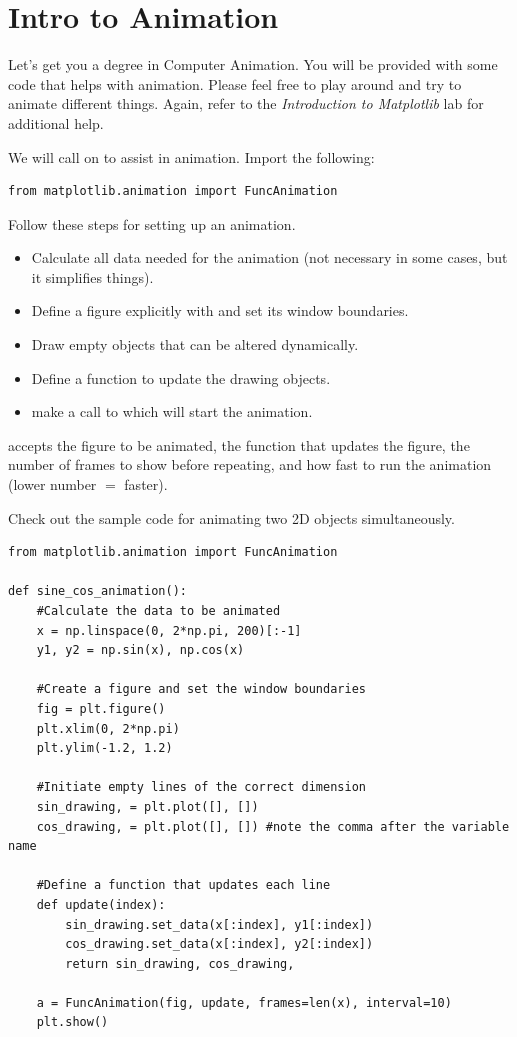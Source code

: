 \section*{Intro to Animation}
Let's get you a degree in Computer Animation.
You will be provided with some code that helps with animation.
Please feel free to play around and try to animate different things.
Again, refer to the \textit{Introduction to Matplotlib} lab for additional help.

We will call on  to assist in animation. Import the following:
\begin{lstlisting}
from matplotlib.animation import FuncAnimation
\end{lstlisting}
Follow these steps for setting up an animation.
\begin{itemize}
\item Calculate all data needed for the animation (not necessary in some cases, but it simplifies things).
\item Define a figure explicitly with  and set its window boundaries.
\item Draw empty objects that can be altered dynamically.
\item Define a function to update the drawing objects.
\item make a call to  which will start the animation.
\end{itemize}
 accepts the figure to be animated, the function that updates the figure, the number of frames to show before repeating, and how fast to run the animation (lower number $=$ faster).

Check out the sample code for animating two 2D objects simultaneously.
\begin{lstlisting}
from matplotlib.animation import FuncAnimation

def sine_cos_animation():
	#Calculate the data to be animated
	x = np.linspace(0, 2*np.pi, 200)[:-1]
	y1, y2 = np.sin(x), np.cos(x)
	
	#Create a figure and set the window boundaries
	fig = plt.figure()
	plt.xlim(0, 2*np.pi)
	plt.ylim(-1.2, 1.2)
	
	#Initiate empty lines of the correct dimension
	sin_drawing, = plt.plot([], [])
	cos_drawing, = plt.plot([], [])	#note the comma after the variable name
	
	#Define a function that updates each line
	def update(index):
		sin_drawing.set_data(x[:index], y1[:index])
		cos_drawing.set_data(x[:index], y2[:index])
		return sin_drawing, cos_drawing,
	
	a = FuncAnimation(fig, update, frames=len(x), interval=10)
	plt.show()
\end{lstlisting}

